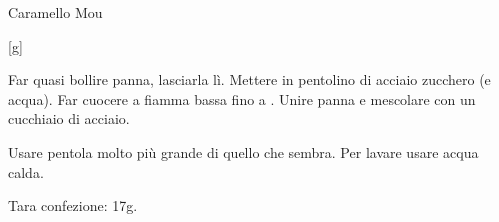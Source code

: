 \begin{recipe}[label=mou]{Caramello Mou}
    \begin{header}
        [g]
    
    \end{header}
    
    \begin{ingredients}[4]
    \end{ingredients}
    
    \begin{preparation}
        \step Far quasi bollire panna, lasciarla lì.
        \step Mettere in pentolino di acciaio zucchero (e acqua).
        \step Far cuocere a fiamma bassa fino a .
        \step Unire panna e mescolare con un cucchiaio di acciaio.
    \end{preparation}
    
    \begin{suggestion}
        \suggestionMark Usare pentola molto più grande di quello che sembra.
            Per lavare usare acqua calda.
        
        \suggestionMark Tara confezione: 17g.
    \end{suggestion}
\end{recipe}
